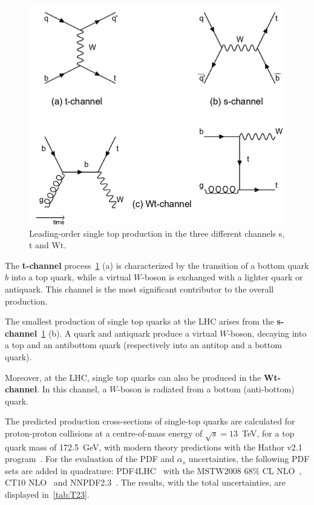 \begin{figure}[h]
	\centering
	\includegraphics[width=0.5\linewidth]{Pics/cp1/single}
	\caption{Leading-order single top production in the three different channels s, t and Wt.} 
	\label{fig:single}
\end{figure}

 The \textbf{t-channel} process~\cref{fig:single} (a) is characterized by the transition of a bottom quark $b$ into a top quark, while a virtual $W$-boson is exchanged with a lighter quark or antiquark. This channel is the most significant contributor to the overall production.

The smallest production of single top quarks at the LHC arises from the \textbf{s-channel}~\cref{fig:single} (b). A quark and antiquark produce a virtual $W$-boson, decaying into a top and an antibottom quark (respectively into an antitop and a bottom quark).

Moreover, at the LHC, single top quarks can also be produced in the \textbf{Wt-channel}. In this channel, a $W$-boson is radiated from a bottom (anti-bottom) quark.

The  predicted production cross-sections of single-top quarks are calculated  for proton-proton collisions at a centre-of-mass energy of $\sqrt{s}=13$~TeV, for a top quark mass of 172.5~GeV, with modern theory predictions with the Hathor v2.1 program~\cite{Aliev:2010zk,Kant:2014oha}. For the evaluation of the PDF and $\alpha_{s}$ uncertainties, the following PDF sets are added in quadrature: PDF4LHC~\cite{Botje:2011sn} with the MSTW2008 68\% CL NLO~\cite{Martin:2009bu,Martin:2009iq}, CT10 NLO~\cite{Lai:2010vv} and NNPDF2.3~\cite{Ball:2012cx}. The results, with the total uncertainties, are displayed in~\cref{tab:T23}.



